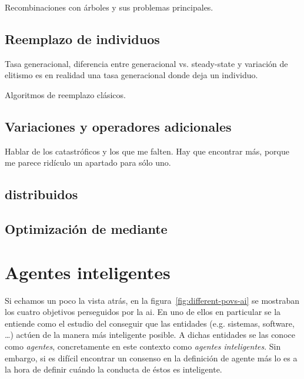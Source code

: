 Recombinaciones con árboles y sus problemas principales.

\subsection{Reemplazo de individuos}

Tasa generacional, diferencia entre generacional vs. steady-state y variación de elitismo es en realidad una tasa generacional donde deja un individuo.

Algoritmos de reemplazo clásicos.

\subsection{Variaciones y operadores adicionales}

Hablar de los catastróficos y los que me falten. Hay que encontrar más, porque me parece ridículo un apartado para sólo uno.

\subsection{ distribuidos}

\subsection{Optimización de  mediante }

\section{Agentes inteligentes}
\label{ch:ci:s:agent-concept}

Si echamos un poco la vista atrás, en la figura~\ref{fig:different-povs-ai} se mostraban los cuatro objetivos perseguidos por la \ac{ai}. En uno de ellos en particular se la entiende como el estudio del conseguir que las entidades (e.g. sistemas, software, \ldots) actúen de la manera más inteligente posible. A dichas entidades se las conoce como \textit{agentes}, concretamente en este contexto como \textit{agentes inteligentes}. Sin embargo, si es difícil encontrar un consenso en la definición de agente más lo es a la hora de definir cuándo la conducta de éstos es inteligente.

